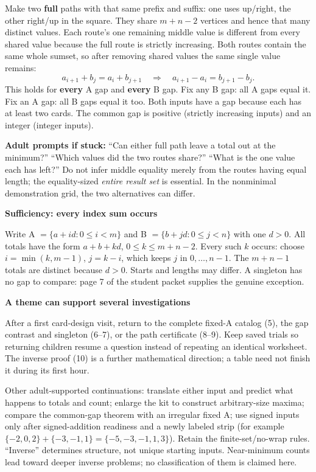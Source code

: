 \documentclass[11pt]{article}
\newcommand{\heading}[1]{\vspace{4pt}{\large\bfseries #1}\par}
\newcommand{\sub}[1]{\textbf{#1}\par}
\newcommand{\sset}[1]{\{#1\}}
\begin{document}
Make two \textbf{full} paths with that same prefix and suffix: one uses up/right, the other right/up in the square. They share $m+n-2$ vertices and hence that many distinct values. Each route's one remaining middle value is different from every shared value because the full route is strictly increasing. Both routes contain the same whole sumset, so after removing shared values the same single value remains:
\[
 a_{i+1}+b_j=a_i+b_{j+1}
 \quad\Longrightarrow\quad
 a_{i+1}-a_i=b_{j+1}-b_j.
\]
This holds for \textbf{every} A gap and \textbf{every} B gap. Fix any B gap: all A gaps equal it. Fix an A gap: all B gaps equal it too. Both inputs have a gap because each has at least two cards. The common gap is positive (strictly increasing inputs) and an integer (integer inputs).

\textbf{Adult prompts if stuck:} ``Can either full path leave a total out at the minimum?'' ``Which values did the two routes share?'' ``What is the one value each has left?'' Do not infer middle equality merely from the routes having equal length; the equality-sized \emph{entire result set} is essential. In the nonminimal demonstration grid, the two alternatives can differ.

\sub{Sufficiency: every index sum occurs}
Write A $=\sset{a+id:0\leq i<m}$ and B $=\sset{b+jd:0\leq j<n}$ with one $d>0$. All totals have the form $a+b+kd$, $0\leq k\leq m+n-2$. Every such $k$ occurs: choose $i=\min(k,m-1)$, $j=k-i$, which keeps $j$ in $0,\ldots,n-1$. The $m+n-1$ totals are distinct because $d>0$. Starts and lengths may differ. A singleton has no gap to compare: page 7 of the student packet supplies the genuine exception.
\newpage

\heading{Return visits, evidence and source scope}
\sub{A theme can support several investigations}
After a first card-design visit, return to the complete fixed-A catalog (5), the gap contrast and singleton (6--7), or the path certificate (8--9). Keep saved trials so returning children resume a question instead of repeating an identical worksheet. The inverse proof (10) is a further mathematical direction; a table need not finish it during its first hour.

Other adult-supported continuations: translate either input and predict what happens to totals and count; enlarge the kit to construct arbitrary-size maxima; compare the common-gap theorem with an irregular fixed A; use signed inputs only after signed-addition readiness and a newly labeled strip (for example $\sset{-2,0,2}+\sset{-3,-1,1}=\sset{-5,-3,-1,1,3}$). Retain the finite-set/no-wrap rules. ``Inverse'' determines structure, not unique starting inputs. Near-minimum counts lead toward deeper inverse problems; no classification of them is claimed here.
\end{document}
